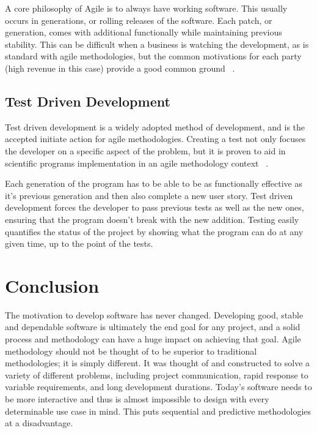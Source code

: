 \documentclass[11pt]{article}
\newcommand{\tab}{\hspace*{2em}}
\begin{document}
\begin{doublespace}
\tab A core philosophy of Agile is to always have working software. This usually occurs in generations, or rolling releases of the software. Each patch, or generation, comes with additional functionally while maintaining previous stability. This can be difficult when a business is watching the development, as is standard with agile methodologies, but the common motivations for each party (high revenue in this case) provide a good common ground ~\cite{Ktata:2009:ADI:1557626.1557636}. 

\subsection{Test Driven Development}

\tab Test driven development is a widely adopted method of development, and is the accepted initiate action for agile methodologies. Creating a test not only focuses the developer on a specific aspect of the problem, but it is proven to aid in scientific programs implementation in an agile methodology context ~\cite{Sletholt:2011:LRA:1985782.1985784}. 

\tab Each generation of the program has to be able to be as functionally effective as it’s previous generation and then also complete a new user story. Test driven development forces the developer to pass previous tests as well as the new ones, ensuring that the program doesn’t break with the new addition. Testing easily quantifies the status of the project by showing what the program can do at any given time, up to the point of the tests.  

\section{Conclusion}

\tab The motivation to develop software has never changed. Developing good, stable and dependable software is ultimately the end goal for any project, and a solid process and methodology can have a huge impact on achieving that goal. Agile methodology should not be thought of to be superior to traditional methodologies; it is simply different. It was thought of and constructed to solve a variety of different problems, including project communication, rapid response to variable requirements, and long development durations. Today’s software needs to be more interactive and thus is almost impossible to design with every determinable use case in mind. This puts sequential and predictive methodologies at a disadvantage.





\end{doublespace}
\end{document}
